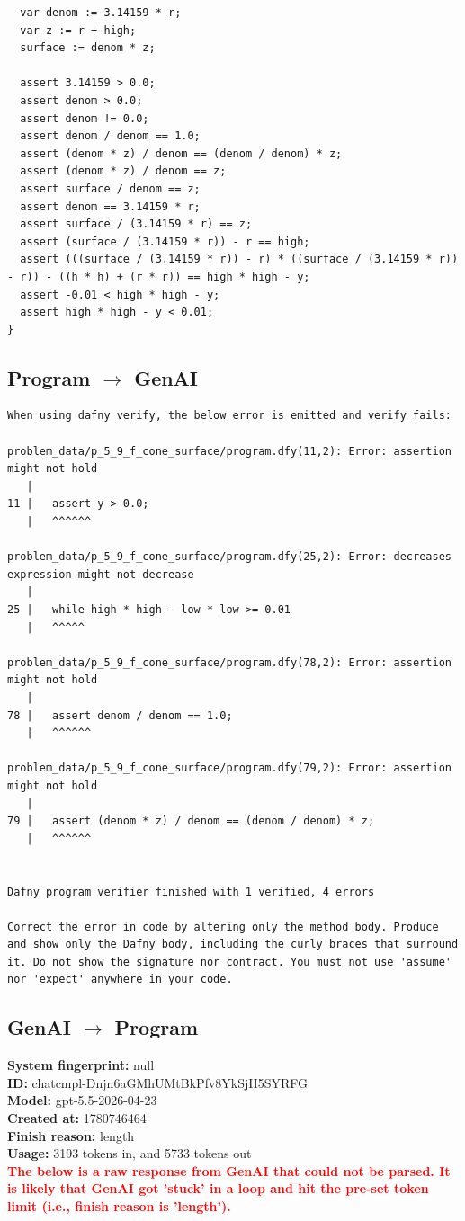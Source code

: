 \documentclass{article}
\begin{document}
\begin{lstlisting}
  var denom := 3.14159 * r;
  var z := r + high;
  surface := denom * z;

  assert 3.14159 > 0.0;
  assert denom > 0.0;
  assert denom != 0.0;
  assert denom / denom == 1.0;
  assert (denom * z) / denom == (denom / denom) * z;
  assert (denom * z) / denom == z;
  assert surface / denom == z;
  assert denom == 3.14159 * r;
  assert surface / (3.14159 * r) == z;
  assert (surface / (3.14159 * r)) - r == high;
  assert (((surface / (3.14159 * r)) - r) * ((surface / (3.14159 * r)) - r)) - ((h * h) + (r * r)) == high * high - y;
  assert -0.01 < high * high - y;
  assert high * high - y < 0.01;
}
\end{lstlisting}
\subsection*{Program $\rightarrow$ GenAI}
\begin{lstlisting}
When using dafny verify, the below error is emitted and verify fails:

problem_data/p_5_9_f_cone_surface/program.dfy(11,2): Error: assertion might not hold
   |
11 |   assert y > 0.0;
   |   ^^^^^^

problem_data/p_5_9_f_cone_surface/program.dfy(25,2): Error: decreases expression might not decrease
   |
25 |   while high * high - low * low >= 0.01
   |   ^^^^^

problem_data/p_5_9_f_cone_surface/program.dfy(78,2): Error: assertion might not hold
   |
78 |   assert denom / denom == 1.0;
   |   ^^^^^^

problem_data/p_5_9_f_cone_surface/program.dfy(79,2): Error: assertion might not hold
   |
79 |   assert (denom * z) / denom == (denom / denom) * z;
   |   ^^^^^^


Dafny program verifier finished with 1 verified, 4 errors

Correct the error in code by altering only the method body. Produce and show only the Dafny body, including the curly braces that surround it. Do not show the signature nor contract. You must not use 'assume' nor 'expect' anywhere in your code.
\end{lstlisting}
\subsection*{GenAI $\rightarrow$ Program}
\textbf{System fingerprint: }null
\\\textbf{ID: }chatcmpl-Dnjn6aGMhUMtBkPfv8YkSjH5SYRFG
\\\textbf{Model: }gpt-5.5-2026-04-23
\\\textbf{Created at: }1780746464
\\\textbf{Finish reason: }length
\\\textbf{Usage: }3193 tokens in, and 5733 tokens out
\\\textcolor{red}{\textbf{The below is a raw response from GenAI that could not be parsed. It is likely that GenAI got 'stuck' in a loop and hit the pre-set token limit (i.e., finish reason is 'length').}}
\begin{lstlisting}

\end{lstlisting}
\end{document}
